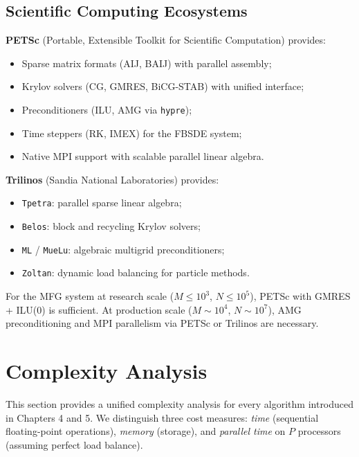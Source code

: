 \subsection{Scientific Computing Ecosystems}

\textbf{PETSc} (Portable, Extensible Toolkit for Scientific Computation) provides:
\begin{itemize}
    \item Sparse matrix formats (AIJ, BAIJ) with parallel assembly;
    \item Krylov solvers (CG, GMRES, BiCG-STAB) with unified interface;
    \item Preconditioners (ILU, AMG via \texttt{hypre});
    \item Time steppers (RK, IMEX) for the FBSDE system;
    \item Native MPI support with scalable parallel linear algebra.
\end{itemize}

\textbf{Trilinos} (Sandia National Laboratories) provides:
\begin{itemize}
    \item \texttt{Tpetra}: parallel sparse linear algebra;
    \item \texttt{Belos}: block and recycling Krylov solvers;
    \item \texttt{ML} / \texttt{MueLu}: algebraic multigrid preconditioners;
    \item \texttt{Zoltan}: dynamic load balancing for particle methods.
\end{itemize}

For the MFG system at research scale ($M \le 10^3$, $N \le 10^5$), PETSc with
GMRES + ILU(0) is sufficient. At production scale ($M \sim 10^4$, $N \sim 10^7$),
AMG preconditioning and MPI parallelism via PETSc or Trilinos are necessary.

\section{Complexity Analysis}
\label{sec:sc-complexity}

This section provides a unified complexity analysis for every algorithm introduced
in Chapters 4 and 5. We distinguish three cost measures: \textit{time} (sequential
floating-point operations), \textit{memory} (storage), and \textit{parallel time}
on $P$ processors (assuming perfect load balance).

